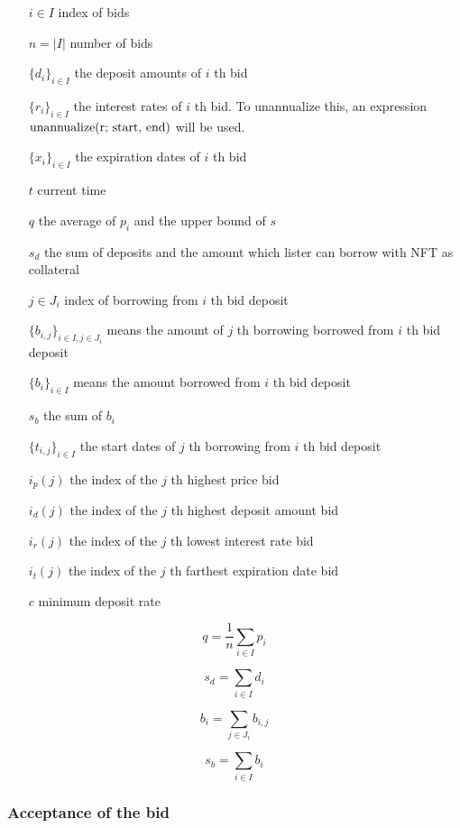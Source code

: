 \documentclass[dvipdfmx]{jsarticle}
\begin{document}
\begin{itemize}
  \item[$i \in I$] index of bids
  \item[$n = |I|$] number of bids
  \item[$\{d_i\}_{i \in I}$] the deposit amounts of $i$ th bid
  \item[$\{r_i\}_{i \in I}$] the interest rates of $i$ th bid. To unannualize this, an expression $\text{unannualize(r; \text{start}, \text{end})}$ will be used.
  \item[$\{x_i\}_{i \in I}$] the expiration dates of $i$ th bid
  \item[$t$] current time 
  \item[$q$] the average of $p_i$ and the upper bound of $s$
  \item[$s_d$] the sum of deposits and the amount which lister can borrow with NFT as collateral
  \item[$j \in J_i$] index of borrowing from $i$ th bid deposit 
  \item[$\{b_{i,j}\}_{i \in I, j \in J_i}$] means the amount of $j$ th borrowing borrowed from $i$ th bid deposit
  \item[$\{b_i\}_{i \in I}$] means the amount borrowed from $i$ th bid deposit
  \item[$s_b$] the sum of $b_i$
  \item[$\{t_{i,j}\}_{i \in I}$] the start dates of $j$ th borrowing from $i$ th bid deposit
  \item[$i_p(j)$] the index of the $j$ th highest price bid
  \item[$i_d(j)$] the index of the $j$ th highest deposit amount bid
  \item[$i_r(j)$] the index of the $j$ th lowest interest rate bid
  \item[$i_t(j)$] the index of the $j$ th farthest expiration date bid
  \item[$c$] minimum deposit rate
\end{itemize}

$$
  q = \frac{1}{n} \sum_{i \in I} p_i
$$

$$
  s_d = \sum_{i \in I} d_i
$$

$$
  b_i = \sum_{j \in J_i} b_{i,j}
$$

$$
  s_b = \sum_{i \in I} b_i
$$

\subsubsection{Acceptance of the bid}
\end{document}
